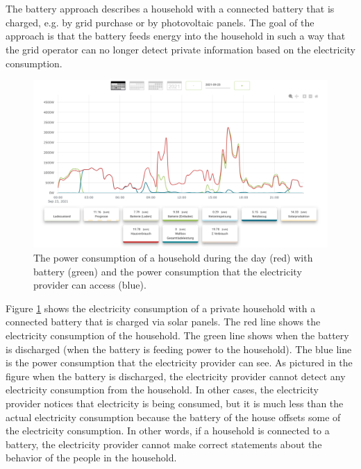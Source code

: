 \\
\\
The battery approach describes a household with a connected battery that is charged, e.g. by grid purchase or by photovoltaic panels. The goal of the approach is that the battery feeds energy into the household in such a way that the grid operator can no longer detect private information based on the electricity consumption. \\
\begin{figure}[tbp]
  \centering
  \includegraphics[width=1\textwidth]{images/Battery4.png}
  \caption[Battery Consumption Figure]{The power consumption of a household during the day (red) with battery (green) and the power consumption that the electricity provider can access (blue).}
  \label{fig:Battery}
\end{figure} Figure \ref{fig:Battery} shows the electricity consumption of a private household with a connected battery that is charged via solar panels. The red line shows the electricity consumption of the household. The green line shows when the battery is discharged (when the battery is feeding power to the household). The blue line is the power consumption that the electricity provider can see. As pictured in the figure when the battery is discharged, the electricity provider cannot detect any electricity consumption from the household. In other cases, the electricity provider notices that electricity is being consumed, but it is much less than the actual electricity consumption because the battery of the house offsets some of the electricity consumption. In other words, if a household is connected to a battery, the electricity provider cannot make correct statements about the behavior of the people in the household. \\
